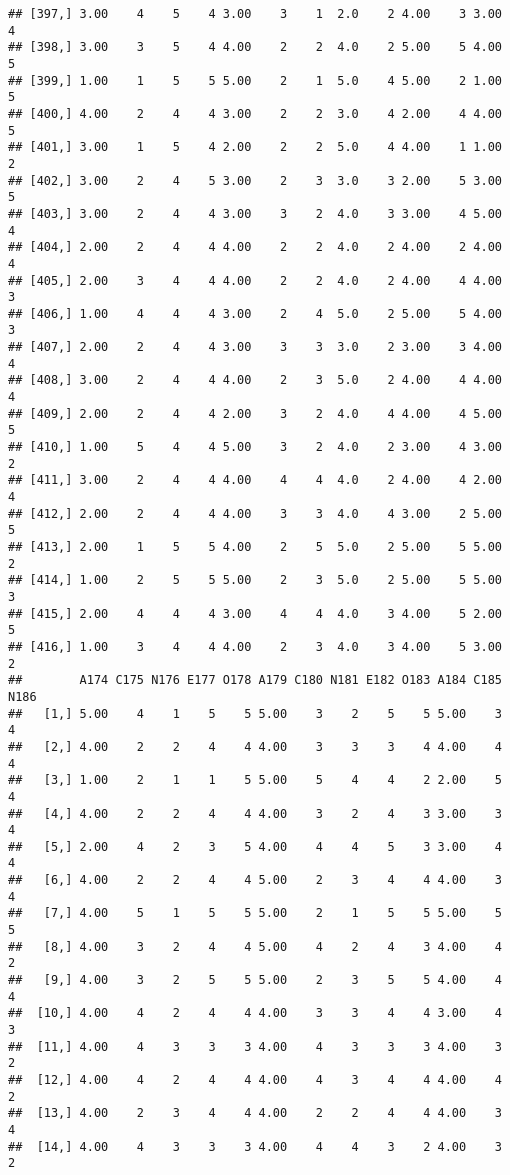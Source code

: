 \documentclass[]{article}
\begin{document}
\begin{verbatim}
## [397,] 3.00    4    5    4 3.00    3    1  2.0    2 4.00    3 3.00    4
## [398,] 3.00    3    5    4 4.00    2    2  4.0    2 5.00    5 4.00    5
## [399,] 1.00    1    5    5 5.00    2    1  5.0    4 5.00    2 1.00    5
## [400,] 4.00    2    4    4 3.00    2    2  3.0    4 2.00    4 4.00    5
## [401,] 3.00    1    5    4 2.00    2    2  5.0    4 4.00    1 1.00    2
## [402,] 3.00    2    4    5 3.00    2    3  3.0    3 2.00    5 3.00    5
## [403,] 3.00    2    4    4 3.00    3    2  4.0    3 3.00    4 5.00    4
## [404,] 2.00    2    4    4 4.00    2    2  4.0    2 4.00    2 4.00    4
## [405,] 2.00    3    4    4 4.00    2    2  4.0    2 4.00    4 4.00    3
## [406,] 1.00    4    4    4 3.00    2    4  5.0    2 5.00    5 4.00    3
## [407,] 2.00    2    4    4 3.00    3    3  3.0    2 3.00    3 4.00    4
## [408,] 3.00    2    4    4 4.00    2    3  5.0    2 4.00    4 4.00    4
## [409,] 2.00    2    4    4 2.00    3    2  4.0    4 4.00    4 5.00    5
## [410,] 1.00    5    4    4 5.00    3    2  4.0    2 3.00    4 3.00    2
## [411,] 3.00    2    4    4 4.00    4    4  4.0    2 4.00    4 2.00    4
## [412,] 2.00    2    4    4 4.00    3    3  4.0    4 3.00    2 5.00    5
## [413,] 2.00    1    5    5 4.00    2    5  5.0    2 5.00    5 5.00    2
## [414,] 1.00    2    5    5 5.00    2    3  5.0    2 5.00    5 5.00    3
## [415,] 2.00    4    4    4 3.00    4    4  4.0    3 4.00    5 2.00    5
## [416,] 1.00    3    4    4 4.00    2    3  4.0    3 4.00    5 3.00    2
##        A174 C175 N176 E177 O178 A179 C180 N181 E182 O183 A184 C185 N186
##   [1,] 5.00    4    1    5    5 5.00    3    2    5    5 5.00    3    4
##   [2,] 4.00    2    2    4    4 4.00    3    3    3    4 4.00    4    4
##   [3,] 1.00    2    1    1    5 5.00    5    4    4    2 2.00    5    4
##   [4,] 4.00    2    2    4    4 4.00    3    2    4    3 3.00    3    4
##   [5,] 2.00    4    2    3    5 4.00    4    4    5    3 3.00    4    4
##   [6,] 4.00    2    2    4    4 5.00    2    3    4    4 4.00    3    4
##   [7,] 4.00    5    1    5    5 5.00    2    1    5    5 5.00    5    5
##   [8,] 4.00    3    2    4    4 5.00    4    2    4    3 4.00    4    2
##   [9,] 4.00    3    2    5    5 5.00    2    3    5    5 4.00    4    4
##  [10,] 4.00    4    2    4    4 4.00    3    3    4    4 3.00    4    3
##  [11,] 4.00    4    3    3    3 4.00    4    3    3    3 4.00    3    2
##  [12,] 4.00    4    2    4    4 4.00    4    3    4    4 4.00    4    2
##  [13,] 4.00    2    3    4    4 4.00    2    2    4    4 4.00    3    4
##  [14,] 4.00    4    3    3    3 4.00    4    4    3    2 4.00    3    2

\end{verbatim}
\end{document}
